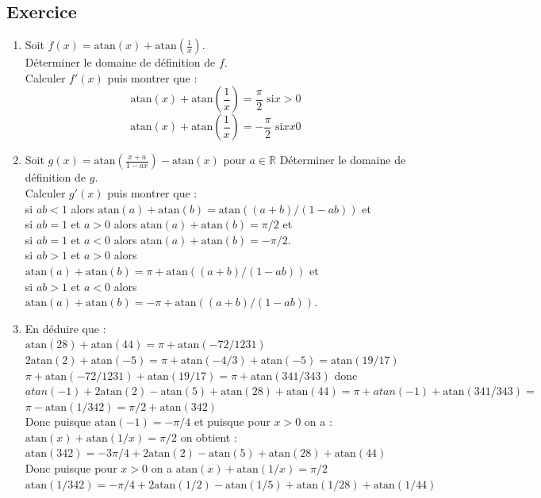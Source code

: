 \documentclass[a4paper,11pt]{book}
\newcommand{\R}{{\mathbb{R}}}
\newcommand{\atan}{\mbox{atan}}
\begin{document}
\subsection{Exercice}
\begin{enumerate}
\item Soit $f(x)=\atan(x)+\atan(\frac{1}{x})$.\\
D\'eterminer le domaine de d\'efinition de $f$.\\
Calculer $f'(x)$ puis montrer que :
$$\atan(x)+\atan(\frac{1}{x})=\frac{\pi}{2} \mbox{ si} x>0$$
$$\atan(x)+\atan(\frac{1}{x})=-\frac{\pi}{2} \mbox{ si} xx0$$
\item Soit $g(x)=\atan(\frac{x+a}{1-ax})-\atan(x)$ pour $a\in \R$
D\'eterminer le domaine de d\'efinition de $g$.\\
Calculer $g'(x)$ puis montrer que :\\
si $ab<1$ alors $\atan(a)+\atan(b)=\atan((a+b)/(1-ab))$ et \\
si $ab=1$ et $a>0$ alors $\atan(a)+\atan(b)=\pi/2$ et\\
si $ab=1$ et $a<0$ alors $\atan(a)+\atan(b)=-\pi/2$.\\
si $ab>1$ et $a>0$ alors $\atan(a)+\atan(b)=\pi+\atan((a+b)/(1-ab))$ et\\
si $ab>1$ et $a<0$ alors $\atan(a)+\atan(b)=-\pi+\atan((a+b)/(1-ab))$.
\item En d\'eduire que :\\
$\atan(28)+\atan(44)=\pi+\atan(-72/1231)$\\
$2\atan(2)+\atan(-5)=\pi+\atan(-4/3)+\atan(-5)=\atan(19/17)$\\
$\pi+\atan(-72/1231)+\atan(19/17)=\pi+\atan(341/343)$ donc\\
$atan(-1)+2\atan(2)-\atan(5)+\atan(28)+\atan(44)=\pi+atan(-1)+\atan(341/343)=$\\
$\pi-\atan(1/342)=\pi/2+\atan(342)$\\
Donc puisque $\atan(-1)=-\pi/4$ et puisque pour $x>0$ on a :\\
$\atan(x)+\atan(1/x)=\pi/2$ on obtient :\\
$\atan(342)=-3\pi/4+2\atan(2)-\atan(5)+\atan(28)+\atan(44)$\\
Donc puisque pour $x>0$ on a $\atan(x)+\atan(1/x)=\pi/2$\\
$\atan(1/342)=-\pi/4+2\atan(1/2)-\atan(1/5)+\atan(1/28)+\atan(1/44)$
\end{enumerate}
\end{document}
